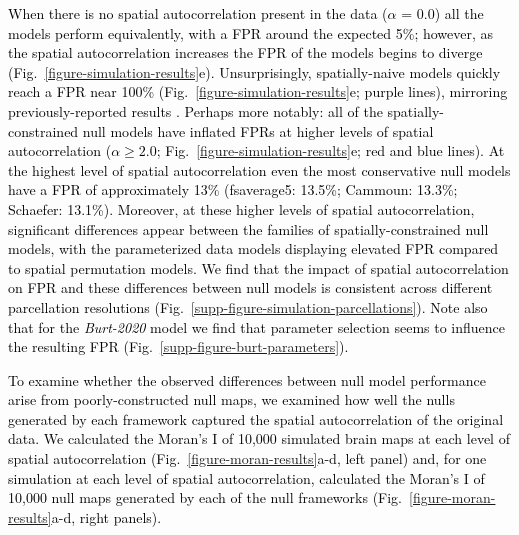 \documentclass[12pt,aps,pra,reprint,showkeys]{revtex4-1}
\newcommand{\nimg}[1]{\textcolor{black}{{#1}}}
\begin{document}
\nimg{When there is no spatial autocorrelation present in the data ($\alpha$ = 0.0) all the models perform equivalently, with a FPR around the expected 5\%; however, as the spatial autocorrelation increases the FPR of the models begins to diverge (Fig.~\ref{figure-simulation-results}e).
Unsurprisingly, spatially-naive models quickly reach a FPR near 100\% (Fig.~\ref{figure-simulation-results}e; purple lines), mirroring previously-reported results \citep{burt2020neuroimage}.
Perhaps more notably: all of the spatially-constrained null models have inflated FPRs at higher levels of spatial autocorrelation ($\alpha \geq 2.0$; Fig.~\ref{figure-simulation-results}e; red and blue lines).
At the highest level of spatial autocorrelation even the most conservative null models have a FPR of approximately 13\% (fsaverage5: 13.5\%; Cammoun: 13.3\%; Schaefer: 13.1\%).
Moreover, at these higher levels of spatial autocorrelation, significant differences appear between the families of spatially-constrained null models, with the parameterized data models displaying elevated FPR compared to spatial permutation models.
We find that the impact of spatial autocorrelation on FPR and these differences between null models is consistent across different parcellation resolutions (Fig.~\ref{supp-figure-simulation-parcellations}).
Note also that for the \textit{Burt-2020} model we find that parameter selection seems to influence the resulting FPR (Fig.~\ref{supp-figure-burt-parameters}).}

\nimg{To examine whether the observed differences between null model performance arise from poorly-constructed null maps, we examined how well the nulls generated by each framework captured the spatial autocorrelation of the original data.
We calculated the Moran's I of 10,000 simulated brain maps at each level of spatial autocorrelation (Fig.~\ref{figure-moran-results}a-d, left panel) and, for one simulation at each level of spatial autocorrelation, calculated the Moran's I of 10,000 null maps generated by each of the null frameworks (Fig.~\ref{figure-moran-results}a-d, right panels).}
\end{document}
